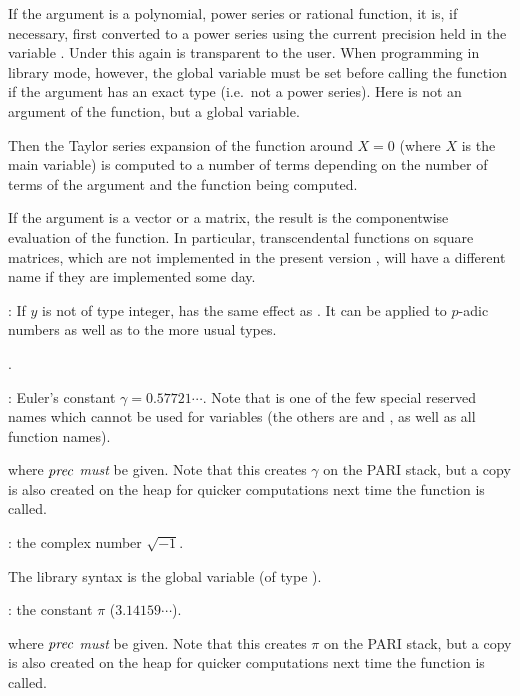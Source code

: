 \item If the argument is a polynomial, power series or rational function,
it is, if necessary, first converted to a power series using the current
precision held in the variable . Under  this again is
transparent to the user. When programming in library mode, however, the
global variable  must be set before calling the function if the
argument has an exact type (i.e.~not a power series). Here  is
not an argument of the function, but a global variable.

Then the Taylor series expansion of the function around $X=0$ (where $X$ is
the main variable) is computed to a number of terms depending on the number
of terms of the argument and the function being computed.

\item If the argument is a vector or a matrix, the result is the
componentwise evaluation of the function. In particular, transcendental
functions on square matrices, which are not implemented in the present
version \vers, will have a different name if they are implemented some day.

\subseckbd{\pow}: If $y$ is not of type integer,  has the same
effect as . It can be applied to $p$-adic numbers as well
as to the more usual types.

.

: Euler's constant $\gamma=0.57721\cdots$. Note that
 is one of the few special reserved names which cannot be used for
variables (the others are  and , as well as all function
names). \label{se:euler}

 where $\hbox{\it prec\/}$ \emph{must} be given. Note that
this creates $\gamma$ on the PARI stack, but a copy is also created on the
heap for quicker computations next time the function is called.

: the complex number $\sqrt{-1}$.

The library syntax is the global variable  (of type ).

: the constant $\pi$ ($3.14159\cdots$).\label{se:pi}

 where $\hbox{\it prec\/}$ \emph{must} be given. Note that
this creates $\pi$ on the PARI stack, but a copy is also created on the heap
for quicker computations next time the function is called.

